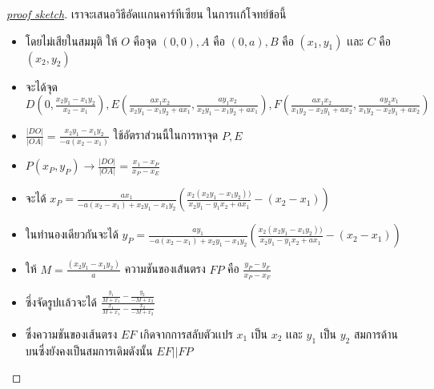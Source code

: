 \documentclass[a4paper,12pt]{article}
\begin{document}
		\begin{proof}[\underline{proof sketch}]เราจะเสนอวิธีอัดเเเกนคาร์ทีเซียน ในการเเก้โจทย์ข้อนี้
		\begin{itemize}
			\item โดยไม่เสียในสมมุติ ให้ $O$ คือจุด $(0,0), A$ คือ $(0,a), B$ คือ $(x_1,y_1)$ เเละ $C$ คือ $(x_2,y_2)$ 
			\item จะได้จุด $D(0,\frac{x_2y_1 - x_1y_2}{x_2 - x_1}), E(\frac{ax_1x_2}{x_2y_1-x_1y_2+ax_1},\frac{ay_1x_2}{x_2y_1-x_1y_2+ax_1}), F(\frac{ax_1x_2}{x_1y_2-x_2y_1+ax_2},\frac{ay_2x_1}{x_1y_2-x_2y_1+ax_2})$ 
			\item $\frac{|DO|}{|OA|} = \frac{x_2y_1-x_1y_2}{-a(x_2-x_1)}$ ใช้อัตราส่วนนี้ในการหาจุด $P,E$
			\item $P(x_P,y_P) \rightarrow \frac{|DO|}{|OA|} = \frac{ x_1 - x_P}{x_P-x_E}  $
			\item จะได้ $x_P = \frac{ax_1}{-a(x_2-x_1)+x_2y_1-x_1y_2}(\frac{x_2(x_2y_1-x_1y_2))}{x_2y_1-y_1x_2+ax_1}-(x_2-x_1))$
			\item ในทำนองเดียวกันจะได้ $y_P =\frac{ay_1}{-a(x_2-x_1)+x_2y_1-x_1y_2}(\frac{x_2(x_2y_1-x_1y_2))}{x_2y_1-y_1x_2+ax_1}-(x_2-x_1))$
			\item ให้ $M=\frac{(x_2y_1-x_1y_2)}{a}$ ความชันของเส้นตรง $FP$ คือ $\frac{y_P-y_F}{x_P-x_F}$
			\item ซึ่งจัดรูปเเล้วจะได้ $\frac{\frac{y_1}{M+x_1}-\frac{y_2}{-M+x_2}}{\frac{x_1}{M+x_1}-\frac{x_2}{-M+x_2}}$
			\item ซึ่งความชันของเส้นตรง $EF$ เกิดจากการสลับตัวเเปร $x_1$ เป็น $x_2$ เเละ $y_1$ เป็น $y_2$ สมการด้านบนซึ่งยังคงเป็นสมการเดิมดังนั้น $EF || FP$ 
		\end{itemize}
	
			
		\end{proof}
	\newpage
\end{document}
